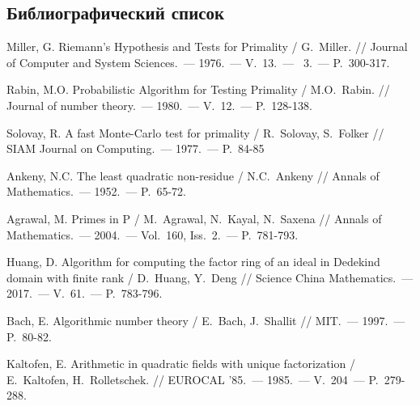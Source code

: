 \documentclass[_00_dissertation.tex]{subfiles}
\begin{document}

\renewcommand{\bibname}{Список использованных источников}

\begin{thebibliography}{99}
\section*{Библиографический список}
\vspace{-12pt}

    Miller, G. Riemann's Hypothesis and Tests for Primality / G.~Miller. // Journal of Computer and System Sciences.~--- 1976.~--- V.~13.~--- ~3.~--- P.~300-317.

    Rabin, M.O. Probabilistic Algorithm for Testing Primality / M.O.~Rabin. // Journal of number theory.~--- 1980.~--- V.~12.~--- P.~128-138.

    Solovay, R. A fast Monte-Carlo test for primality / R.~Solovay, S.~Folker // SIAM Journal on Computing.~--- 1977.~--- P.~84-85

    Ankeny, N.C. The least quadratic non-residue / N.C.~Ankeny // Annals of Mathematics.~--- 1952.~--- P.~65-72.

    Agrawal, M. Primes in P / M.~Agrawal, N.~Kayal, N.~Saxena // Annals of Mathematics.~--- 2004.~--- Vol.~160, Iss.~2.~--- P.~781-793.

    Huang, D. Algorithm for computing the factor ring of an ideal in Dedekind domain with finite rank / D.~Huang, Y.~Deng // Science China Mathematics.~--- 2017.~--- V.~61.~--- P.~783-796.

    Bach, E. Algorithmic number theory / E.~Bach, J.~Shallit // MIT.~--- 1997.~--- P.~80-82.

    Kaltofen, E. Arithmetic in quadratic fields with unique factorization / E.~Kaltofen, H.~Rolletschek. // EUROCAL '85.~--- 1985.~--- V.~204~--- P.~279-288.


\end{thebibliography}
\end{document}
